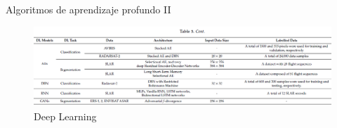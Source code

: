 \begin{frame}{Algoritmos de aprendizaje profundo II}
    \begin{figure}
        \centering
        \includegraphics[scale=0.5]{img/section_02/oil_spill_detection_deep_learning2.png}
        \caption{Deep Learning \cite{rs12203338}}
        \label{fig:my_label}
    \end{figure}
\end{frame}


